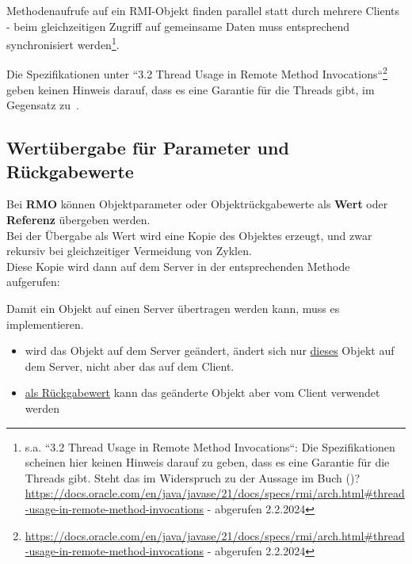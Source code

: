 \begin{tcolorbox}[enlarge top by=0.5cm,enlarge bottom by=0.5cm]
    Methodenaufrufe auf ein RMI-Objekt finden parallel statt durch mehrere Clients - beim gleichzeitigen Zugriff auf gemeinsame Daten muss entsprechend synchronisiert werden\footnote{
        s.a. ``3.2 Thread Usage in Remote Method Invocations``: Die Spezifikationen scheinen hier keinen Hinweis darauf zu geben, dass es eine Garantie für die Threads gibt. Steht das im Widerspruch zu der Aussage im Buch (\cite[330]{Oec22})? \url{https://docs.oracle.com/en/java/javase/21/docs/specs/rmi/arch.html#thread-usage-in-remote-method-invocations} - abgerufen 2.2.2024
    }.
\end{tcolorbox}

\begin{tcolorbox}[colback=red!20,color=white,title=Anmerkung]
    Die Spezifikationen unter ``3.2 Thread Usage in Remote Method Invocations``\footnote{
        \url{https://docs.oracle.com/en/java/javase/21/docs/specs/rmi/arch.html#thread-usage-in-remote-method-invocations} - abgerufen 2.2.2024
    } geben keinen Hinweis darauf, dass es eine Garantie für die Threads gibt, im Gegensatz zu~\cite[330]{Oec22}.
\end{tcolorbox}

\subsection{Wertübergabe für Parameter und Rückgabewerte}\label{sec:valuermi}

Bei \textbf{RMO} können Objektparameter oder Objektrückgabewerte als \textbf{Wert} oder \textbf{Referenz} übergeben werden.\\

\noindent
Bei der Übergabe als Wert wird eine Kopie des Objektes erzeugt, und zwar rekursiv bei gleichzeitiger Vermeidung von Zyklen.\\

\noindent
Diese Kopie wird dann auf dem Server in der entsprechenden Methode aufgerufen:

\begin{tcolorbox}[enlarge top by=0.5cm,enlarge bottom by=0.5cm]
    Damit ein Objekt auf einen Server übertragen werden kann, muss es  implementieren.
\end{tcolorbox}

\begin{itemize}
    \item wird das Objekt auf dem Server geändert, ändert sich nur \ul{dieses} Objekt auf dem Server, nicht aber das auf dem Client.
    \item \ul{als Rückgabewert} kann das geänderte Objekt aber vom Client verwendet werden
\end{itemize}

